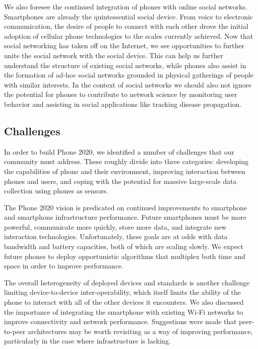 We also foresee the continued integration of phones with online social
networks. Smartphones are already the quintessential social device. From
voice to electronic communication, the desire of people to connect with each
other drove the initial adoption of cellular phone technologies to the scales
currently achieved. Now that social networking has taken off on the Internet,
we see opportunities to further unite the social network with the social
device. This can help us further understand the structure of existing social
networks, while phones also assist in the formation of ad-hoc social networks
grounded in physical gatherings of people with similar interests. In the
context of social networks we should also not ignore the potential for phones
to contribute to network science by monitoring user behavior and assisting in
social applications like tracking disease propagation.

\subsection{Challenges}

In order to build Phone 2020, we identified a number of challenges that our
community must address. These roughly divide into three categories:
developing the capabilities of phone and their environment, improving
interaction between phones and users, and coping with the potential for
massive large-scale data collection using phones as sensors.
 
The Phone 2020 vision is predicated on continued improvements to smartphone
and smartphone infrastructure performance. Future smartphones must be more
powerful, communicate more quickly, store more data, and integrate new
interaction technologies. Unfortunately, these goals are at odds with data
bandwidth and battery capacities, both of which are scaling slowly. We expect
future phones to deploy opportunistic algorithms that multiplex both time and
space in order to improve performance.
 
The overall heterogeneity of deployed devices and standards is another
challenge limiting device-to-device inter-operability, which itself limits
the ability of the phone to interact with all of the other devices it
encounters. We also discussed the importance of integrating the smartphone
with existing Wi-Fi networks to improve connectivity and network performance.
Suggestions were made that peer-to-peer architectures may be worth revisiting
as a way of improving performance, particularly in the case where
infrastructure is lacking.
 
